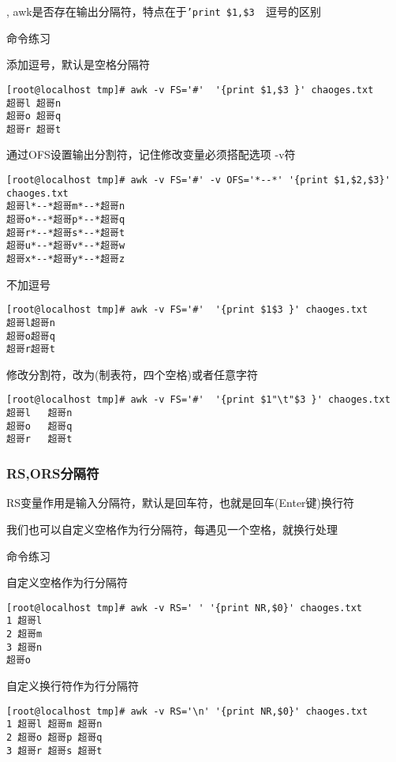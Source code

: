 ,
awk是否存在输出分隔符，特点在于\texttt{'{print \$1,\$3 } }逗号的区别
\begin{ascolorbox10}{命令练习}
	
	\begin{ascboxJ}{添加逗号，默认是空格分隔符}
		\begin{lstlisting}[style=linux]
[root@localhost tmp]# awk -v FS='#'  '{print $1,$3 }' chaoges.txt
超哥l 超哥n
超哥o 超哥q
超哥r 超哥t
		\end{lstlisting}
	\end{ascboxJ}
	\begin{ascboxJ}{通过OFS设置输出分割符，记住修改变量必须搭配选项 -v符}
		\begin{lstlisting}[style=linux]
[root@localhost tmp]# awk -v FS='#' -v OFS='*--*' '{print $1,$2,$3}' chaoges.txt
超哥l*--*超哥m*--*超哥n
超哥o*--*超哥p*--*超哥q
超哥r*--*超哥s*--*超哥t
超哥u*--*超哥v*--*超哥w
超哥x*--*超哥y*--*超哥z
		\end{lstlisting}
	\end{ascboxJ}
	\begin{ascboxJ}{不加逗号}
		\begin{lstlisting}[style=linux]
[root@localhost tmp]# awk -v FS='#'  '{print $1$3 }' chaoges.txt
超哥l超哥n
超哥o超哥q
超哥r超哥t
		\end{lstlisting}
	\end{ascboxJ}
	\begin{ascboxJ}{修改分割符，改为(制表符，四个空格)或者任意字符}
		\begin{lstlisting}[style=linux]
[root@localhost tmp]# awk -v FS='#'  '{print $1"\t"$3 }' chaoges.txt
超哥l   超哥n
超哥o   超哥q
超哥r   超哥t
		\end{lstlisting}
	\end{ascboxJ}
\end{ascolorbox10}

\subsubsection{RS,ORS分隔符}
RS变量作用是输入分隔符，默认是回车符，也就是回车(Enter键)换行符

我们也可以自定义空格作为行分隔符，每遇见一个空格，就换行处理

\begin{ascolorbox10}{命令练习}
	\begin{ascboxJ}{自定义空格作为行分隔符}
		\begin{lstlisting}[style=linux]
[root@localhost tmp]# awk -v RS=' ' '{print NR,$0}' chaoges.txt
1 超哥l
2 超哥m
3 超哥n
超哥o
		\end{lstlisting}
	\end{ascboxJ}
\end{ascolorbox10}
	\begin{ascboxJ}{自定义换行符作为行分隔符}
	\begin{lstlisting}[style=linux]
[root@localhost tmp]# awk -v RS='\n' '{print NR,$0}' chaoges.txt
1 超哥l 超哥m 超哥n
2 超哥o 超哥p 超哥q
3 超哥r 超哥s 超哥t
	\end{lstlisting}
\end{ascboxJ}

